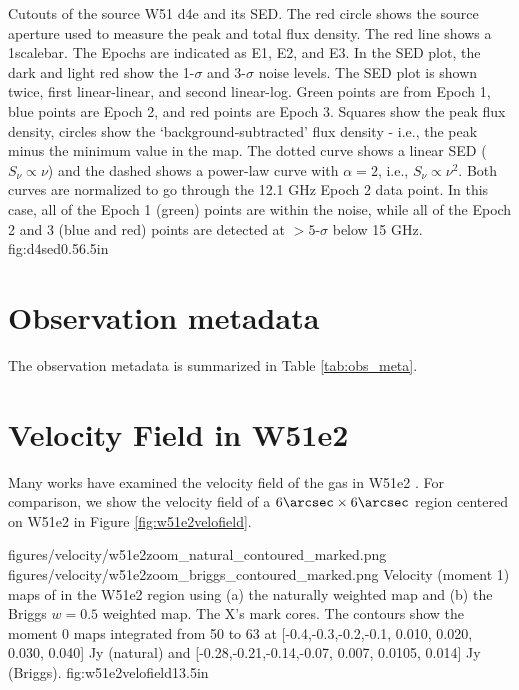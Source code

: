 {Cutouts of the source W51 d4e and its SED.
The red circle shows the source aperture used to measure the peak and total
flux density.  The red line shows a 1\arcsec scalebar.  The Epochs are indicated as E1,
E2, and E3.
In the SED plot, the dark and light red show the 1-$\sigma$ and 3-$\sigma$
noise levels.  The SED plot is shown twice, first linear-linear, and second
linear-log.
Green points are from Epoch 1, blue points are Epoch 2, and red points are
Epoch 3.  Squares show the peak flux density, circles show the
`background-subtracted' flux density - i.e., the peak minus the minimum value
in the map.
The dotted curve shows a linear SED ($S_\nu \propto \nu$) and the dashed shows
a power-law curve with $\alpha=2$, i.e., $S_\nu \propto \nu^2$.  Both curves are
normalized to go through the 12.1 GHz Epoch 2 data point.  In this case, all of
the Epoch 1 (green) points are within the noise, while all of the Epoch 2 and 3
(blue and red) points are detected at $>5$-$\sigma$ below 15 GHz.
}
{fig:d4sed}{0.5}{6.5in}

%

\section{Observation metadata}
\label{sec:obsmeta}
The observation metadata is summarized in Table \ref{tab:obs_meta}.




\section{Velocity Field in W51e2}
\label{sec:vfield}
Many works have examined the velocity field of the gas in W51e2
\citep{Zhang1997a,Keto2008b,Shi2010b,Shi2010a,Goddi2016a}.  For comparison, we
show the velocity field of a $6\arcsec\times6\arcsec$ region centered on W51e2
in Figure
\ref{fig:w51e2velofield}.

\FigureTwo
{figures/velocity/w51e2zoom_natural_contoured_marked.png}
{figures/velocity/w51e2zoom_briggs_contoured_marked.png}
{Velocity (moment 1) maps of \ortho \twotwo in the W51e2 region using (a) the
naturally weighted map and (b) the Briggs $w=0.5$ weighted map.  The X's mark
\citet{Shi2010a} cores.   
The contours show the moment 0 maps integrated from 50 to 63 \kms at
[-0.4,-0.3,-0.2,-0.1, 0.010, 0.020, 0.030, 0.040] Jy \kms (natural) and
[-0.28,-0.21,-0.14,-0.07, 0.007, 0.0105, 0.014] Jy \kms (Briggs).
}
{fig:w51e2velofield}{1}{3.5in}


